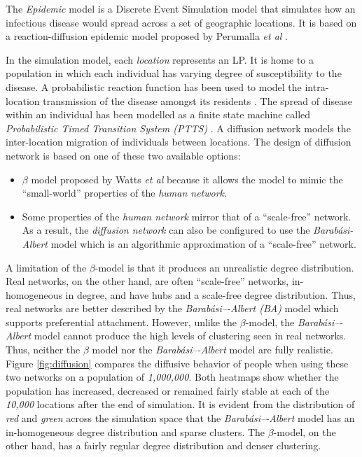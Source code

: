 \documentclass[11pt]{book}
\begin{document}
The \emph{Epidemic} model is a Discrete Event Simulation model that simulates how an infectious disease would
spread across a set of geographic locations.  It is based on a reaction-diffusion epidemic model proposed by
Perumalla \emph{et al} \cite{perumalla-12}.

In the simulation model, each \emph{location} represents an LP\@. It is home to a population in which each
individual has varying degree of susceptibility to the disease.  A probabilistic reaction function has been
used to model the intra-location transmission of the disease amongst its residents \cite{barrett-08}.  The
spread of disease within an individual has been modelled as a finite state machine called \emph{Probabilistic
  Timed Transition System (PTTS)} \cite{barrett-08}.  A diffusion network models the inter-location migration
of individuals between locations.  The design of diffusion network is based on one of these two available
options:

\begin{itemize}

\item \emph{$\beta$} model proposed by Watts \emph{et al} \cite{watts-98} because it allows the model to mimic
  the ``small-world'' properties of the \emph{human network}.

\item Some properties of the \emph{human network} mirror that of a ``scale-free'' network.  As a result, the
  \emph{diffusion network} can also be configured to use the \emph{Barabási-Albert} model \cite{barabasi-99}
  which is an algorithmic approximation of a ``scale-free'' network.

\end{itemize}

\noindent
A limitation of the \emph{$\beta$}-model \cite{watts-98} is that it produces an unrealistic degree
distribution.  Real networks, on the other hand, are often ``scale-free'' networks, in-homogeneous in degree,
and have hubs and a scale-free degree distribution.  Thus, real networks are better described by the
\emph{Barabási–-Albert (BA)} model \cite{barabasi-99} which supports preferential attachment.  However, unlike
the \emph{$\beta$}-model, the \emph{Barabási–-Albert} model cannot produce the high levels of clustering seen
in real networks.  Thus, neither the \emph{$\beta$} model nor the \emph{Barabási–-Albert} model are fully
realistic.  Figure \ref{fig:diffusion} compares the diffusive behavior of people when using these two networks
on a population of \emph{1,000,000}.  Both heatmaps show whether the population has increased, decreased or
remained fairly stable at each of the \emph{10,000} locations after the end of simulation.  It is evident from
the distribution of \emph{red} and \emph{green} across the simulation space that the \emph{Barabási–-Albert}
model has an in-homogeneous degree distribution and sparse clusters.  The \emph{$\beta$}-model, on the other
hand, has a fairly regular degree distribution and denser clustering.
\end{document}
